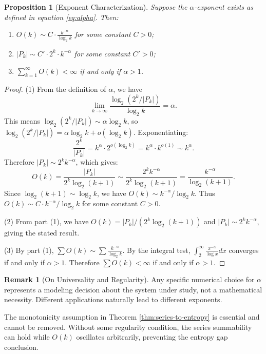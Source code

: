 \documentclass[11pt]{article}
\newtheorem{proposition}[theorem]{Proposition}
\theoremstyle{definition}
\newtheorem{remark}[theorem]{Remark}
\begin{document}
\begin{proposition}[Exponent Characterization]\label{prop:alpha-char}
Suppose the $\alpha$-exponent exists as defined in equation \eqref{eq:alpha}. Then:
\begin{enumerate}
\item $O(k) \sim C \cdot \frac{k^{-\alpha}}{\log_2 k}$ for some constant $C > 0$;
\item $|P_k| \sim C' \cdot 2^k \cdot k^{-\alpha}$ for some constant $C' > 0$;
\item $\sum_{k=1}^\infty O(k) < \infty$ if and only if $\alpha > 1$.
\end{enumerate}
\end{proposition}

\begin{proof}
(1) From the definition of $\alpha$, we have
$$\lim_{k \to \infty} \frac{\log_2(2^k/|P_k|)}{\log_2 k} = \alpha.$$
This means $\log_2(2^k/|P_k|) \sim \alpha \log_2 k$, so $\log_2(2^k/|P_k|) = \alpha \log_2 k + o(\log_2 k)$. Exponentiating:
$$\frac{2^k}{|P_k|} = k^\alpha \cdot 2^{o(\log_2 k)} = k^\alpha \cdot k^{o(1)} \sim k^\alpha.$$
Therefore $|P_k| \sim 2^k k^{-\alpha}$, which gives:
$$O(k) = \frac{|P_k|}{2^k \log_2(k+1)} \sim \frac{2^k k^{-\alpha}}{2^k \log_2(k+1)} = \frac{k^{-\alpha}}{\log_2(k+1)}.$$
Since $\log_2(k+1) \sim \log_2 k$, we have $O(k) \sim k^{-\alpha}/\log_2 k$. Thus $O(k) \sim C \cdot k^{-\alpha}/\log_2 k$ for some constant $C > 0$.

(2) From part (1), we have $O(k) = |P_k|/(2^k \log_2(k+1))$ and $|P_k| \sim 2^k k^{-\alpha}$, giving the stated result.

(3) By part (1), $\sum O(k) \sim \sum \frac{k^{-\alpha}}{\log_2 k}$. By the integral test, $\int_2^\infty \frac{x^{-\alpha}}{\log x} dx$ converges if and only if $\alpha > 1$. Therefore $\sum O(k) < \infty$ if and only if $\alpha > 1$.
\end{proof}

\begin{remark}[On Universality and Regularity]\label{rem:universality}
Any specific numerical choice for $\alpha$ represents a modeling decision about the system under study, not a mathematical necessity. Different applications naturally lead to different exponents.

The monotonicity assumption in Theorem \ref{thm:series-to-entropy} is essential and cannot be removed. Without some regularity condition, the series summability can hold while $O(k)$ oscillates arbitrarily, preventing the entropy gap conclusion.
\end{remark}
\end{document}
